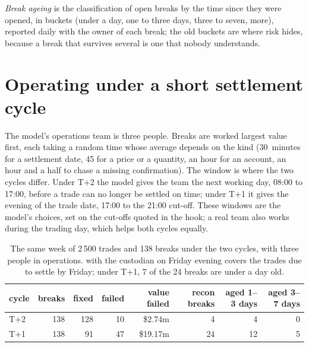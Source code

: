 \begin{definition}\label{def:pl:post-trade-systems:ageing}
\emph{Break ageing} is the classification of open breaks by the time since they were opened, in buckets (under a day, one
to three days, three to seven, more), reported daily with the owner of each break; the old buckets are where risk hides, because a break that
survives several  is one that nobody understands.
\end{definition}

\section{Operating under a short settlement cycle}

The model's operations team is three people. Breaks are worked largest value first, each taking a random time whose average depends on the kind
(30~minutes for a settlement date, 45 for a price or a quantity, an hour for an account, an hour and a half to chase a missing confirmation). The
window is where the two cycles differ. Under T+2 the model gives the team the next working day, 08:00 to 17:00, before a trade can no longer be
settled on time; under T+1 it gives the evening of the trade date, 17:00 to the 21:00  cut-off. These windows are the model's
choices, set on the cut-offs quoted in the hook; a real team also works during the trading day, which helps both cycles equally.

\label{lst:pl:post-trade-systems:resolve}

\begin{table}[htbp]
\centering\small
\begin{tabular}{lrrrrrrr}
\toprule
cycle & breaks & fixed & failed & value failed & recon breaks & aged 1--3 days & aged 3--7 days\\
\midrule
T+2 & 138 & 128 & 10 & \$2.74m & 4 & 4 & 0\\
T+1 & 138 & 91 & 47 & \$19.17m & 24 & 12 & 5\\
\bottomrule
\end{tabular}
\caption{The same week of 2\,500 trades and 138 breaks under the two cycles, with three people in operations.  with the custodian
on Friday evening covers the trades due to settle by Friday; under T+1, 7 of the 24 breaks are under a day old.}
\label{tab:pl:post-trade-systems:cycles}
\end{table}

